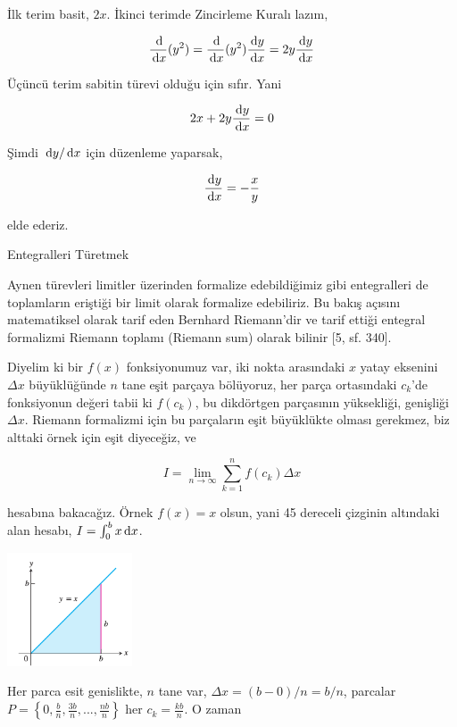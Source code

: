 \documentclass[12pt,fleqn]{article}\usepackage{../../common}
\begin{document}
İlk terim basit, $2x$. İkinci terimde Zincirleme Kuralı lazım,

$$
\frac{\,\mathrm{d}}{\,\mathrm{d} x} (y^2) = \frac{\,\mathrm{d}}{\,\mathrm{d} x} (y^2) \frac{\,\mathrm{d} y}{\,\mathrm{d} x} =
2y \frac{\,\mathrm{d} y}{\,\mathrm{d} x}
$$

Üçüncü terim sabitin türevi olduğu için sıfır. Yani

$$
2x + 2y \frac{\,\mathrm{d} y}{\,\mathrm{d} x} = 0
$$

Şimdi $\,\mathrm{d} y / \,\mathrm{d} x$ için düzenleme yaparsak,

$$
\frac{\,\mathrm{d} y}{\,\mathrm{d} x} = -\frac{x}{y}
$$

elde ederiz.















Entegralleri Türetmek

Aynen türevleri limitler üzerinden formalize edebildiğimiz gibi
entegralleri de toplamların eriştiği bir limit olarak formalize
edebiliriz. Bu bakış açısını matematiksel olarak tarif eden Bernhard
Riemann'dir ve tarif ettiği entegral formalizmi Riemann toplamı (Riemann
sum) olarak bilinir [5, sf. 340]. 

Diyelim ki bir $f(x)$ fonksiyonumuz var, iki nokta arasındaki $x$ yatay
eksenini $\Delta x$ büyüklüğünde $n$ tane eşit parçaya bölüyoruz, her parça
ortasındaki $c_k$'de fonksiyonun değeri tabii ki $f(c_k)$, bu dikdörtgen
parçasının yüksekliği, genişliği $\Delta x$. Riemann formalizmi için bu
parçaların eşit büyüklükte olması gerekmez, biz alttaki örnek için eşit
diyeceğiz, ve

$$ 
I = \lim_{n \to \infty} \sum_{k=1}^{n} f(c_k) \Delta x
$$

hesabına bakacağız. Örnek $f(x) = x$ olsun, yani 45 dereceli çizginin
altındaki alan hesabı, $I = \int_{0}^{b} x \,\mathrm{d} x$.

\includegraphics[width=10em]{ode_mattuck_94_int_01.png}

Her parca esit genislikte, $n$ tane var, $\Delta x = (b - 0) / n = b/n$,
parcalar $P = \left\{ 0, \frac{b}{n}, \frac{3b}{n}, ..., \frac{nb}{n}
\right\}$ her $c_k = \frac{kb}{n}$. O zaman 
\end{document}
